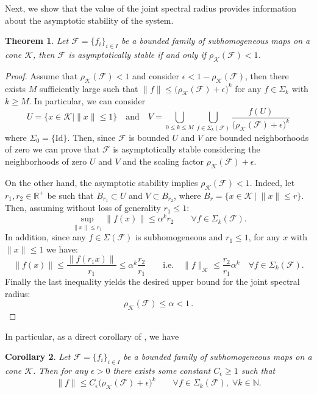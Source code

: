 \documentclass{article}
\newtheorem{theorem}{Theorem}[section]
\newtheorem{corollary}[theorem]{Corollary}
\newcommand{\R}{\mathbb{R}}
\newcommand{\N}{\mathbb{N}}
\newcommand{\family}{\mathcal{F}}
\newcommand{\cradius}{\rho_{\cone}}
\newcommand{\cone}{\mathcal{K}}
\begin{document}
Next, we show that the value of the joint spectral radius provides information about the asymptotic stability of the system.


\begin{theorem}\label{Theorem_asymptotic_stability_via_JSR}
    Let $\family=\{f_i\}_{i\in I}$ be a bounded family of subhomogeneous maps on a cone $\cone$, then $\family$ is asymptotically stable if and only if $\cradius(\family)<1$.
\end{theorem}
\begin{proof}
Assume that $\cradius(\family)<1$ and consider $\epsilon< 1-\cradius(\family)$, then there exists $M$ sufficiently large such that $\|f\|\leq \big(\cradius(\family)+\epsilon\big)^k $ for any $f\in \Sigma_{k}$ with $k\geq M$. In particular, we can consider 
\begin{equation}
    U=\{x\in\cone | \|x\|\leq 1\} \quad  \text{and} \quad V= \bigcup_{0\leq k\leq M}\bigcup_{f\in \Sigma_k(\family)}\frac{f(U)}{\big(\cradius(\family)+\epsilon\big)^k}
\end{equation}
where $\Sigma_0=\{\mathrm{Id}\}$. Then, since $\family$ is bounded $U$ and $V$ are bounded neighborhoods of zero we can prove that $\family$ is asymptotically stable considering the neighborhoods of zero $U$ and $V$ and the scaling factor $\cradius(\family)+\epsilon$.

On the other hand, the asymptotic stability implies $\cradius(\family)<1$. Indeed, let $r_1,r_2\in \R^+$ be such that $B_{r_1}\subset U$ and $V\subset B_{r_2}$, where $B_r=\{x\in \cone\,|\;\|x\|\leq r\}$. Then, assuming without loss of generality $r_1\leq 1$: 
%
\begin{equation}
\sup_{\|x\|\leq r_1}\|f(x)\|\leq \alpha^k r_2\qquad \forall f\in \Sigma_k(\family).     
\end{equation}
%
In addition, since any $f\in \Sigma(\family)$ is subhomogeneous and $r_1\leq 1$, for any $x$ with $\|x\|\leq 1$
we have: 
%
\begin{equation}
    \|f(x)\|\leq \frac{\|f(r_1 x)\|}{r_1}\leq \alpha^k \frac{r_2}{r_1} \qquad \text{i.e.}\quad  \|f\|_{\cone}\leq \frac{r_2}{r_1}\alpha^k \quad \forall f\in\Sigma_k(\family). 
\end{equation}
Finally the last inequality yields the desired upper bound for the joint spectral radius:
\begin{equation}
\cradius(\family)\leq \alpha < 1\,.
\end{equation}
\end{proof}
%
%
In particular, as a direct corollary of ,  we have 
\begin{corollary}\label{Corollary_decay_norms_semigroup}
    Let $\family=\{f_i\}_{i\in I}$ be a bounded family of subhomogeneous maps on a cone $\cone$. Then for any $\epsilon>0$ there exists some constant $C_{\epsilon}\geq 1$ such that 
    $$\|f\|\leq C_{\epsilon}\big(\cradius(\family)+\epsilon\big)^k \qquad \forall f\in \Sigma_k(\family),\; \forall k\in \N.$$
\end{corollary}
\end{document}
